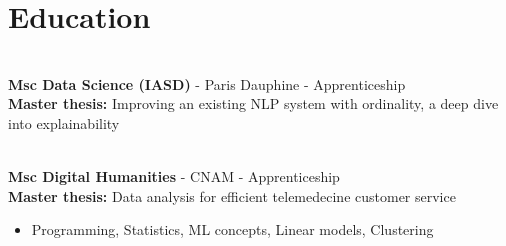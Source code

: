 \documentclass[a4paper,10pt]{article}
\begin{document}
\begin{adjustbox}{valign=t}
\begin{minipage}{0.6\textwidth}
        \section*{Education}
        \vspace{-.3cm}
        \begin{description}
            \raggedright
            \item [\normalfont \textcolor{ColorOne}{2021 -- 2022}]~\\
                  \textbf{Msc Data Science (IASD)} - Paris Dauphine - Apprenticeship\\
                  \textbf{Master thesis:} Improving an existing NLP system with ordinality, a deep dive into explainability
            \item [\normalfont \textcolor{ColorOne}{2019 -- 2021}]~\\
                  \textbf{Msc Digital Humanities} - CNAM - Apprenticeship\\
                  \textbf{Master thesis:} Data analysis for efficient telemedecine customer service\\
                  \small
                  \begin{itemize}[topsep=0pt]
                      \item Programming, Statistics, ML concepts, Linear models, Clustering\\[.2cm]
                  \end{itemize}
                  \normalsize


\end{description}
\end{minipage}
\end{adjustbox}
\end{document}
